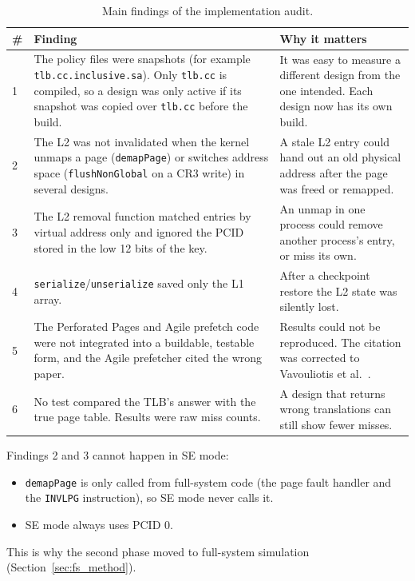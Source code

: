\begin{table}[H]
\centering
\small
\caption{Main findings of the implementation audit.}
\label{tab:audit}
\begin{tabularx}{\textwidth}{l X X}
\toprule
\textbf{\#} & \textbf{Finding} & \textbf{Why it matters} \\
\midrule
1 & The policy files were snapshots (for example \texttt{tlb.cc.inclusive.sa}). Only \texttt{tlb.cc} is compiled, so a design was only active if its snapshot was copied over \texttt{tlb.cc} before the build. & It was easy to measure a different design from the one intended. Each design now has its own build. \\
2 & The L2 was not invalidated when the kernel unmaps a page (\texttt{demapPage}) or switches address space (\texttt{flushNonGlobal} on a CR3 write) in several designs. & A stale L2 entry could hand out an old physical address after the page was freed or remapped. \\
3 & The L2 removal function matched entries by virtual address only and ignored the PCID stored in the low 12 bits of the key. & An unmap in one process could remove another process's entry, or miss its own. \\
4 & \texttt{serialize}/\texttt{unserialize} saved only the L1 array. & After a checkpoint restore the L2 state was silently lost. \\
5 & The Perforated Pages and Agile prefetch code were not integrated into a buildable, testable form, and the Agile prefetcher cited the wrong paper. & Results could not be reproduced. The citation was corrected to Vavouliotis et al.~\cite{vavouliotis2021agile}. \\
6 & No test compared the TLB's answer with the true page table. Results were raw miss counts. & A design that returns wrong translations can still show fewer misses. \\
\bottomrule
\end{tabularx}
\end{table}

Findings 2 and 3 cannot happen in SE mode:
\begin{itemize}
    \item \texttt{demapPage} is only called from full-system code (the page fault handler and the \texttt{INVLPG} instruction), so SE mode never calls it.
    \item SE mode always uses PCID 0.
\end{itemize}
This is why the second phase moved to full-system simulation (Section~\ref{sec:fs_method}).

